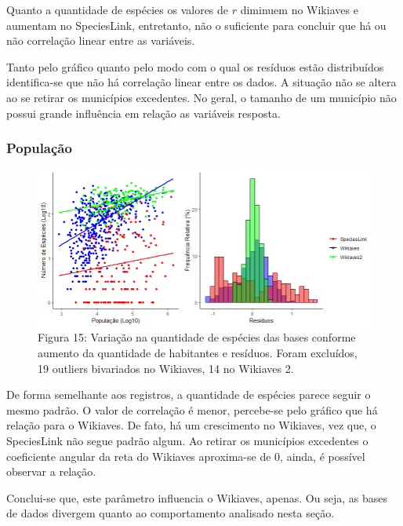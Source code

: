 \documentclass[12pt]{extarticle}
\newenvironment{resposta}{ \color{mygray}}{}
\begin{document}
 \begin{resposta}
Quanto a quantidade de espécies os valores de $r$ diminuem no Wikiaves e aumentam no SpeciesLink, entretanto, não o suficiente para concluir que há ou não correlação linear entre as variáveis.

Tanto pelo gráfico quanto pelo modo com o qual os resíduos estão distribuídos identifica-se que não há correlação linear entre os dados. A situação não se altera ao se retirar os municípios excedentes. No geral, o tamanho de um município não possui grande influência em relação as variáveis resposta.
\end{resposta}

\subsubsection{População}

 \newpage

\begin{figure}[h!]
\centering
\includegraphics[width = 15cm]{Imagens/G08.png}
\\{\scriptsize Figura 15: Variação na quantidade de espécies das bases conforme aumento da quantidade de habitantes e resíduos. Foram excluídos, 19 outliers bivariados no Wikiaves, 14 no Wikiaves 2.}
\end{figure}

\begin{resposta}
De forma semelhante aos registros, a quantidade de espécies parece seguir o mesmo padrão. O valor de correlação é menor, percebe-se pelo gráfico que há relação para o Wikiaves. De fato, há um crescimento no Wikiaves, vez que, o SpeciesLink não segue padrão algum. Ao retirar os municípios excedentes o coeficiente angular da reta do Wikiaves aproxima-se de 0, ainda, é possível observar a relação.

Conclui-se que, este parâmetro influencia o Wikiaves, apenas. Ou seja, as bases de dados divergem quanto ao comportamento analisado nesta seção.
\end{resposta}
\end{document}
